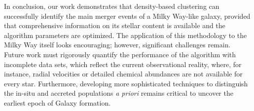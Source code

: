 In conclusion, our work demonstrates that density-based clustering can successfully identify the main merger events of a Milky Way-like galaxy, provided that comprehensive information on its stellar content is available and the algorithm parameters are optimized. The application of this methodology to the Milky Way itself looks encouraging; however, significant challenges remain. Future work must rigorously quantify the performance of the algorithm with incomplete data sets, which reflect the current observational reality, where, for instance, radial velocities or detailed chemical abundances are not available for every star. Furthermore, developing more sophisticated techniques to distinguish the in-situ and accreted populations {\it a priori} remains critical to uncover the earliest epoch of Galaxy formation.


